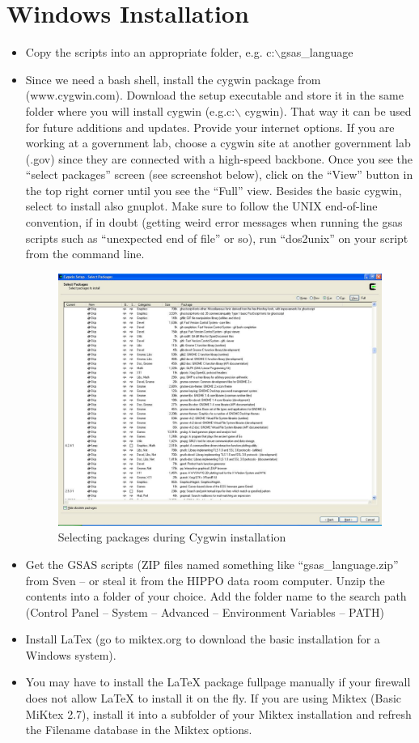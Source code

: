 \section{Windows Installation}

\begin{itemize}
\item Copy the scripts into an appropriate folder, e.g. c:$\backslash$gsas\_language 
\item Since we need a bash shell, install the cygwin package from (www.cygwin.com).  Download the setup executable and store it in the same folder where you will install cygwin (e.g.c:$\backslash$ cygwin). That way it can be used for future additions and updates. Provide your internet options. If you are working at a government lab, choose a cygwin site at another government lab (.gov) since they are connected with a high-speed backbone. Once you see the ``select packages'' screen (see screenshot below), click on the ``View'' button in the top right corner until you see the ``Full'' view. Besides the basic cygwin, select to install also gnuplot.  Make sure to follow the UNIX end-of-line convention, if in doubt (getting weird error messages when running the gsas scripts such as ``unexpected end of file'' or so), run ``dos2unix'' on your script from the command line.
\begin{figure}[h]
\centering
	\includegraphics[width=12cm]{Screenshot1.pdf}
\caption{Selecting packages during Cygwin installation}
\label{fig:Screenshot1}
\end{figure}

\item Get the GSAS scripts (ZIP files named something like
``gsas\_language.zip'' from Sven -- or steal it from the HIPPO data room computer. Unzip the contents into a folder of your choice.
 Add the folder name to the search path (Control Panel -- System -- Advanced
-- Environment Variables -- PATH)
\item Install LaTex (go to miktex.org to download the basic installation for a Windows system).
\item You may have to install the LaTeX package fullpage manually if your firewall does not allow LaTeX to install it on the fly. If you are using Miktex (Basic MiKtex 2.7), install it into a subfolder of your Miktex installation and refresh the Filename database in the Miktex options.
\end{itemize}

